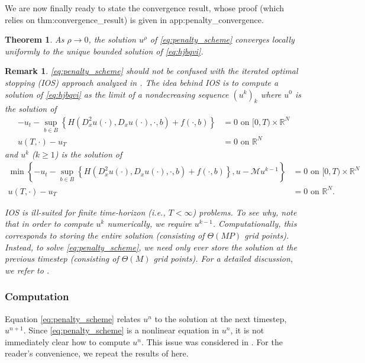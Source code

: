 \documentclass[12pt]{article}
\newcounter{dummy}
\newtheorem{rem}[dummy]{Remark}
\newtheorem{theorem}[dummy]{Theorem}
\begin{document}
We are now finally ready to state the convergence result, whose proof
(which relies on {\prettyref}{thm:convergence_result}) is given in
{\prettyref}{app:penalty_convergence}.
\begin{theorem}
\label{thm:penalty_convergence}As $\rho\rightarrow0$, the solution
$u^{\rho}$ of \eqref{eq:penalty_scheme} converges locally uniformly
to the unique bounded solution of \eqref{eq:hjbqvi}.
\end{theorem}
\begin{rem}\label{rem:ios}\eqref{eq:penalty_scheme} should not
be confused with the iterated optimal stopping (IOS) approach analyzed
in \cite{MR2314777}. The idea behind IOS is to compute a solution
of \eqref{eq:hjbqvi} as the limit of a nondecreasing sequence $(u^{k})_{k}$
where $u^{0}$ is the solution of
\begin{align*}
-u_{t}-\sup_{b\in B}\left\{ H(D_{x}^{2}u(\cdot),D_{x}u(\cdot),\cdot,b)+f(\cdot,b)\right\}  & =0\text{ on }[0,T)\times\mathbb{R}^{N}\\
u(T,\cdot)-u_{T} & =0\text{ on }\mathbb{R}^{N}
\end{align*}
and $u^{k}$ ($k{\geqslant}1$) is the solution of
\begin{align*}
\min\left\{ -u_{t}-\sup_{b\in B}\left\{ H(D_{x}^{2}u(\cdot),D_{x}u(\cdot),\cdot,b)+f(\cdot,b)\right\} ,u-\mathcal{M}u^{k-1}\right\}  & =0\text{ on }[0,T)\times\mathbb{R}^{N}\\
u(T,\cdot)-u_{T} & =0\text{ on }\mathbb{R}^{N}.
\end{align*}

IOS is ill-suited for finite time-horizon (i.e., $T<\infty$) problems.
To see why, note that in order to compute $u^{k}$ numerically, we
require $u^{k-1}$. Computationally, this corresponds to storing the
entire solution (consisting of $\Theta(MP)$ grid points). Instead,
to solve \eqref{eq:penalty_scheme}, we need only ever store the solution
at the previous timestep (consisting of $\Theta(M)$ grid points).
For a detailed discussion, we refer to \cite{MR3150265}.\end{rem}

\subsubsection{\label{subsec:penalty_scheme_computation}Computation}

Equation \eqref{eq:penalty_scheme} relates $u^{n}$ to the solution
at the next timestep, $u^{n+1}$. Since \eqref{eq:penalty_scheme}
is a nonlinear equation in $u^{n}$, it is not immediately clear how
to compute $u^{n}$. This issue was considered in \cite{MR3493959}.
For the reader's convenience, we repeat the results of \cite{MR3493959}
here.
\end{document}
